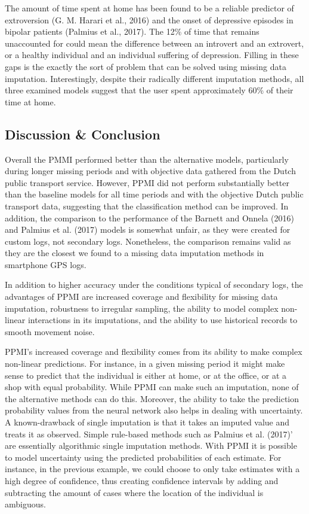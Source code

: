 \documentclass[man]{apa6}
\theoremstyle{definition}
\theoremstyle{definition}
\theoremstyle{definition}
\theoremstyle{remark}
\begin{document}
The amount of time spent at home has been found to be a reliable
predictor of extroversion (G. M. Harari et al., 2016) and the onset of
depressive episodes in bipolar patients (Palmius et al., 2017). The 12\%
of time that remains unaccounted for could mean the difference between
an introvert and an extrovert, or a healthy individual and an individual
suffering of depression. Filling in these gaps is the exactly the sort
of problem that can be solved using missing data imputation.
Interestingly, despite their radically different imputation methods, all
three examined models suggest that the user spent approximately 60\% of
their time at home.

\subsection{Discussion \& Conclusion}\label{discussion-conclusion}

Overall the PMMI performed better than the alternative models,
particularly during longer missing periods and with objective data
gathered from the Dutch public transport service. However, PPMI did not
perform substantially better than the baseline models for all time
periods and with the objective Dutch public transport data, suggesting
that the classification method can be improved. In addition, the
comparison to the performance of the Barnett and Onnela (2016) and
Palmius et al. (2017) models is somewhat unfair, as they were created
for custom logs, not secondary logs. Nonetheless, the comparison remains
valid as they are the closest we found to a missing data imputation
methods in smartphone GPS logs.

In addition to higher accuracy under the conditions typical of secondary
logs, the advantages of PPMI are increased coverage and flexibility for
missing data imputation, robustness to irregular sampling, the ability
to model complex non-linear interactions in its imputations, and the
ability to use historical records to smooth movement noise.

PPMI's increased coverage and flexibility comes from its ability to make
complex non-linear predictions. For instance, in a given missing period
it might make sense to predict that the individual is either at home, or
at the office, or at a shop with equal probability. While PPMI can make
such an imputation, none of the alternative methods can do this.
Moreover, the ability to take the prediction probability values from the
neural network also helps in dealing with uncertainty. A known-drawback
of single imputation is that it takes an imputed value and treats it as
observed. Simple rule-based methods such as Palmius et al. (2017)' are
essentially algorithmic single imputation methods. With PPMI it is
possible to model uncertainty using the predicted probabilities of each
estimate. For instance, in the previous example, we could choose to only
take estimates with a high degree of confidence, thus creating
confidence intervals by adding and subtracting the amount of cases where
the location of the individual is ambiguous.
\end{document}
